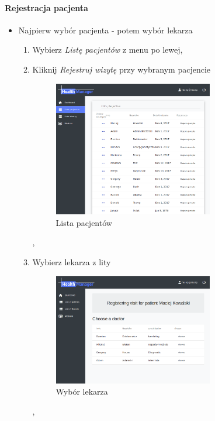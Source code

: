 \documentclass[polish,12pt]{aghthesis}
\begin{document}
    \paragraph{Rejestracja pacjenta}{
       \begin{itemize}
           \item Najpierw wybór pacjenta - potem wybór lekarza
           \begin{enumerate}
             \item Wybierz \emph{Listę pacjentów} z menu po lewej,
             \item Kliknij \emph{Rejestruj wizytę} przy wybranym pacjencie
               \begin{figure}[H]
               \includegraphics[width=0.7\textwidth]{gui-recep-patientlist}
               \caption{Lista pacjentów}
               \end{figure},
             \item Wybierz lekarza z lity
               \begin{figure}[H]
               \includegraphics[width=0.7\textwidth]{gui-recep-register-for-patient}
               \caption{Wybór lekarza}
               \end{figure} ,

\end{enumerate}
\end{itemize}}
\end{document}
